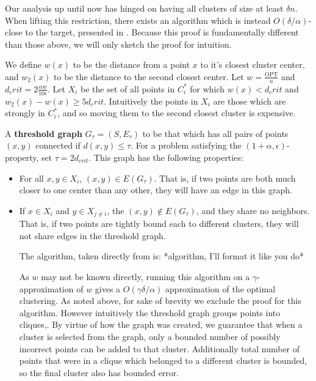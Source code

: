 \documentclass[paper=a4, fontsize=11pt]{scrartcl} %
\numberwithin{equation}{section} %
\numberwithin{figure}{section} %
\numberwithin{table}{section} %
\begin{document}
Our analysis up until now has hinged on having all clusters of size at least $\delta n$. When lifting this restriction, there exists an algorithm which is instead $O(\delta/\alpha)$-close to the target, presented in \cite{firstpaper}. Because this proof is fundamentally different than those above, we will only sketch the proof for intuition. 

We define $w(x)$ to be the distance from a point $x$ to it's closest cluster center, and $w_2(x)$ to be the distance to the second closest center. Let $w = \frac{\text{OPT}}{n}$ and $d_crit = 2\frac{\alpha w}{10 \epsilon}$. Let $X_i$ be the set of all points in $C_i^*$ for which $w(x) < d_crit$ and $w_2(x) - w(x) \geq 5d_crit$. Intuitively the points in $X_i$ are those which are strongly in $C_i^*$, and so moving them to the second closest cluster is expensive.

A \textbf{threshold graph} $G_\tau = (S, E_\tau)$ to be that which has all pairs of points $(x, y)$ connected if $d(x, y) \leq \tau$. For a problem satisfying the $(1 + \alpha, \epsilon)$-property, set $\tau = 2d_{crit}$. This graph has the following properties:

\begin{itemize}
\item For all $x, y \in X_i$, $(x,y) \in E(G_\tau)$. That is, if two points are both much closer to one center than any other, they will have an edge in this graph.

\item If $x \in X_i$ and $y \in X_{j \neq i}$, the $(x,y) \notin E(G_\tau)$, and they share no neighbors. That is, if two points are tightly bound each to different clusters, they will not share edges in the threshold graph. 

The algorithm, taken directly from \cite{firstpaper} is: *algorithm, I'll format it like you do*

As $w$ may not be known directly, running this algorithm on a $\gamma$-approximation of $w$ gives a $O(\gamma\delta/\alpha)$ approximation of the optimal clustering. As noted above, for sake of brevity we exclude the proof for this algorithm. However intuitively the threshold graph groups points into cliques,. By virtue of how the graph was created, we guarantee that when a cluster is selected from the graph, only a bounded number of possibly incorrect points can be added to that cluster. Additionally total number of points that were in a clique which belonged to a different cluster is bounded, so the final cluster also has bounded error. 

\end{itemize}
\end{document}
